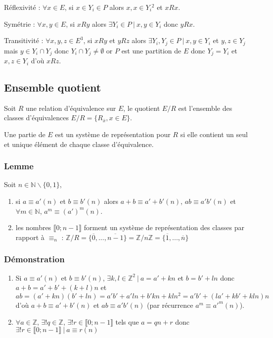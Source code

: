 \documentclass[a4paper,10pt]{book} %
\newcommand{\N}{\mathbb{N}}
\newcommand{\Z}{\mathbb{Z}}
\newcommand{\tq}{~|~}
\begin{document}
Réflexivité : $\forall x\in E$, si $x\in Y_i\in P$ alors $x,x\in Y_i{}^2$ et $xRx$.

Symétrie : $\forall x,y\in E$, si $xRy$ alors $\exists Y_i\in P \tq x,y\in Y_i$ donc $yRx$.

Transitivité : $\forall x,y,z\in E^3$, si $xRy$ et $yRz$ alors $\exists Y_i, Y_j\in P \tq x,y\in Y_i$ et $y,z\in Y_j$\\
mais $y\in Y_i\cap Y_j$ donc $Y_i\cap Y_j\neq \emptyset$ or $P$ est une partition de $E$ donc $Y_j=Y_i$
et $x,z\in Y_i$ d'où $xRz$.

\subsection{Ensemble quotient}
Soit $R$ une relation d'équivalence sur $E$, le quotient $E/R$ est l'ensemble des classes d'équivalences $E/R=\{R_{\overline{x}}, x\in E\}$.

\smallskip

Une partie de $E$ est un système de représentation pour $R$ si elle contient un seul et unique élément de chaque classe d'équivalence.

\subsubsection{Lemme}
Soit $n\in\N\backslash\{0,1\}$,
\begin{enumerate}
\item si $a\equiv a'(n)$ et $b\equiv b'(n)$ alors $a+b\equiv a'+b'(n)$, $ab\equiv a'b'(n)$ et $\forall m\in \N$, $a^m\equiv (a')^m(n)$.
\item les nombres $\llbracket 0;n-1\rrbracket$ forment un système de représentation des classes par rapport à $\equiv_n$ :
$\Z/R=\{\overline{0}, ..., \overline{n-1}\}=\Z/n\Z=\{\overline{1}, ..., \overline{n}\}$
\end{enumerate}

\subsubsection{Démonstration}
\begin{enumerate}
\item Si $a\equiv a'(n)$ et $b\equiv b'(n)$, $\exists k,l\in \Z^2 \tq a=a'+kn$ et $b=b'+ln$ donc $a+b=a'+b'+(k+l)n$ et $ab=(a'+kn)(b'+ln)=a'b'+a'ln+b'kn+kln^2=a'b'+(la'+kb'+kln)n$\\
d'où $a+b\equiv a'+b'(n)$ et $ab\equiv a'b'(n)$ (par récurrence $a^m\equiv a'^m(n)$).

\item $\forall a\in \Z$, $\exists!q\in \Z$, $\exists ! r\in \llbracket0;n-1\rrbracket$
tels que $a=qn+r$ donc $\exists ! r\in \llbracket0;n-1\rrbracket \tq a\equiv r(n)$
\end{enumerate}
\end{document}
